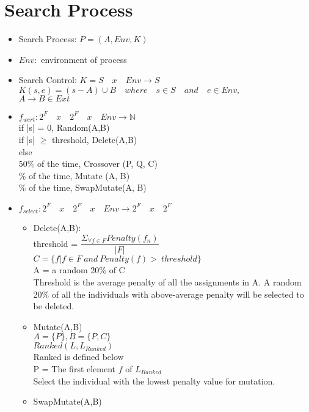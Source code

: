 \documentclass[12 pt]{article}        	%
\begin{document}
\section{Search Process}
\begin{itemize}
\item Search Process: $P = (A, Env, K)$

\item $Env: $ environment of process

\item Search Control: 
$K = S \quad x \quad  Env \to S$
\\ $K(s,e) = (s - A) \cup B \quad where \quad s \in S \quad and \quad e \in Env,$
\\ $A \to B \in Ext$
\item $f_{wert}: 2^F \quad x \quad 2^F \quad x \quad Env \to \mathbb{N}$
\\ if |s| = 0, Random(A,B)
\\ if |s| $\ge$ threshold, Delete(A,B)
\\ else
\\ 50\% of the time, Crossover (P, Q, C)
\\ \% of the time, Mutate (A, B)
\\ \% of the time, SwapMutate(A, B)
\item $f_{select}: 2^F \quad x \quad 2^F \quad x \quad Env \to 2^F \quad x \quad 2^F$
    \begin{itemize}
        \item Delete(A,B):
        \\ threshold = $
        \dfrac{\Sigma_{\forall f \in F} Penalty(f_n)}
        {|F|}$
        \\ $C = \{ f|f \in F \: and \: Penalty(f) > \: threshold \} $
        \\ A = a random 20\% of C
        \\ Threshold is the average penalty of all the assignments in A. A random 20\% of all the individuals with above-average penalty will be selected to be deleted. 
        \item Mutate(A,B)
        \\ $ A= \{P\}, B = \{P, C\}$
        \\$Ranked(L, L_{Ranked})$
        \\ Ranked is defined below
        \\ P = The first element $f$ of $L_{Ranked}$
        \\Select the individual with the lowest penalty value for mutation.
        \item SwapMutate(A,B)

\end{itemize}
\end{itemize}
\end{document}
